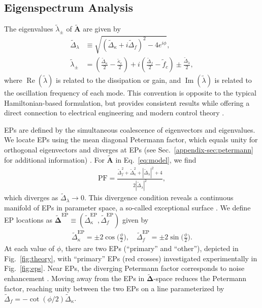 \documentclass[%
  reprint,
  amsmath,amssymb,
  aps,
  prapplied,
  superscriptaddress,
  longbibliography]{revtex4-2}
\begin{document}
\subsection{\label{subsec:eigenvalues} Eigenspectrum Analysis}

The eigenvalues \( \tilde{\lambda}_\pm \) of \( \tilde{\boldsymbol{A}} \) are given by 
\begin{align}
\tilde{\Delta}_\lambda &\equiv \sqrt{ (\tilde{\Delta}_\kappa + i\tilde{\Delta}_f)^2 - 4 e^{i\phi} }, \label{eq:deltalambda_tilde} \\
\tilde{\lambda}_\pm &= \left( \frac{\tilde{\Delta}_\kappa}{2} - \frac{\tilde{\kappa}_c}{2} \right) + i \left( \frac{\tilde{\Delta}_f}{2} - \tilde{f}_c \right) \pm \frac{\tilde{\Delta}_\lambda}{2}, \label{eq:lambda0_tilde}
\end{align}
where \( \operatorname{Re}(\tilde{\lambda}) \) is related to the dissipation or gain, and \( \operatorname{Im}(\tilde{\lambda}) \) is related to the oscillation frequency of each mode. This convention is opposite to the typical Hamiltonian-based formulation, but provides consistent results while offering a direct connection to electrical engineering \cite{salcedo-gallo_demonstration_2025} and modern control theory \cite{juang_identification_2001}. 

EPs are defined by the simultaneous coalescence of eigenvectors and eigenvalues. We locate EPs using the mean diagonal Petermann factor, which equals unity for orthogonal eigenvectors and diverges at EPs (see Sec.~\ref{appendix-sec:petermann} for additional information) \cite{zheng_mathcalpt_2010, ashida_non-hermitian_2020, siegman_excess_1989}. For $\tilde{\boldsymbol{A}}$ in Eq.~\ref{eq:model}, we find
\begin{align}
    \text{PF} = \frac{\tilde{\Delta}_f^2 + \tilde{\Delta}_\kappa^2 + |\tilde{\Delta}_\lambda|^2 + 4}{2|\tilde{\Delta}_\lambda|^2},
\end{align}
which diverges as $\tilde{\Delta}_\lambda \rightarrow 0$. This divergence condition reveals a continuous manifold of EPs in parameter space, a so-called exceptional surface \cite{zhou_exceptional_2019}. We define EP locations as $\boldsymbol{\tilde{\Delta}}^\mathrm{EP} \equiv (\tilde{\Delta}_\kappa^\text{EP}, \tilde{\Delta}_f^\text{EP})$ given by
\begin{align}
    \tilde{\Delta}_\kappa^\text{EP} = \pm 2\cos\bigg(\frac{\phi}{2}\bigg), \quad 
    \tilde{\Delta}_f^\text{EP} = \pm 2\sin \bigg(\frac{\phi}{2}\bigg).
\end{align}
At each value of $\phi$, there are two EPs (``primary'' and ``other''), depicted in Fig.~\ref{fig:theory}, with ``primary'' EPs (red crosses) investigated experimentally in Fig.~\ref{fig:eps}. Near EPs, the diverging Petermann factor corresponds to noise enhancement \cite{wang_petermann-factor_2020, ghosh_suppression_2024}. Moving away from the EPs in $\boldsymbol{\tilde{\Delta}}$-space reduces the Petermann factor, reaching unity between the two EPs on a line parameterized by $\tilde{\Delta}_f = -\cot(\phi/2) \tilde{\Delta}_\kappa$.  
\end{document}
